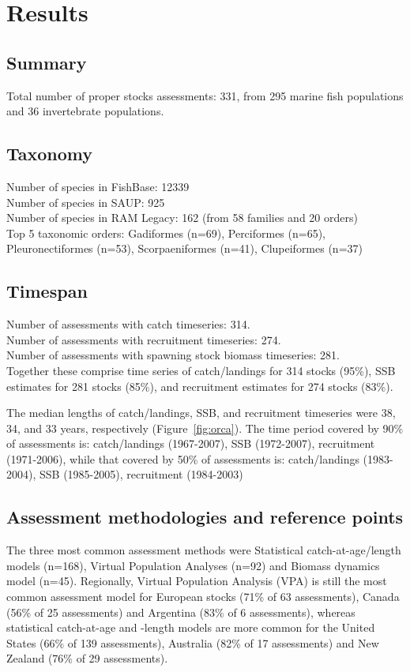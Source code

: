 \section*{Results}
\subsection*{Summary}
\noindent
Total number of proper stocks assessments: 331, from 295 marine fish populations and 36
invertebrate populations.

\subsection*{Taxonomy}
\noindent

Number of species in FishBase: 12339\\
Number of species in SAUP: 925\\
Number of species in RAM Legacy: 162 (from 58 families and 20 orders) \\
Top 5 taxonomic orders: Gadiformes (n=69), Perciformes (n=65), Pleuronectiformes (n=53), Scorpaeniformes (n=41), Clupeiformes (n=37) \\

\subsection*{Timespan}
\noindent
Number of assessments with catch timeseries: 314.\\
Number of assessments with recruitment timeseries: 274.\\
Number of assessments with spawning stock biomass timeseries: 281.\\

Together these comprise time series of
catch/landings for 314 stocks (95\%),
SSB estimates for 281 stocks (85\%), and recruitment estimates for
274 stocks (83\%).

The median lengths of catch/landings, SSB, and recruitment timeseries
were 38, 34, and 33
years, respectively (Figure~\ref{fig:orca}).  The time period covered by 90\% of assessments
is: catch/landings (1967-2007), SSB
(1972-2007), recruitment (1971-2006), while that
covered by 50\% of assessments is: catch/landings
(1983-2004), SSB (1985-2005), recruitment
(1984-2003)
 
\subsection*{Assessment methodologies and reference points}
\noindent
The three most common assessment methods were
Statistical catch-at-age/length models (n=168), Virtual Population Analyses (n=92) and
Biomass dynamics model (n=45). Regionally, Virtual Population Analysis
(VPA) is still the most common assessment model for European stocks
(71\% of 63 assessments),
Canada (56\% of 25
assessments) and Argentina (83\% of
6 assessments), whereas statistical catch-at-age
and -length models are more common for the United States
(66\% of 139 assessments),
Australia (82\% of 17
assessments) and New Zealand (76\% of
29 assessments).

